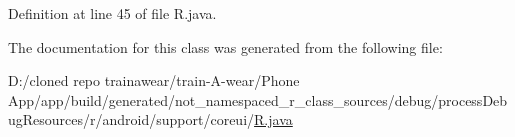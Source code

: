 Definition at line 45 of file R.\+java.



The documentation for this class was generated from the following file\+:\begin{DoxyCompactItemize}
\item 
D\+:/cloned repo trainawear/train-\/\+A-\/wear/\+Phone App/app/build/generated/not\+\_\+namespaced\+\_\+r\+\_\+class\+\_\+sources/debug/process\+Debug\+Resources/r/android/support/coreui/\mbox{\hyperlink{process_debug_resources_2r_2android_2support_2coreui_2_r_8java}{R.\+java}}\end{DoxyCompactItemize}
